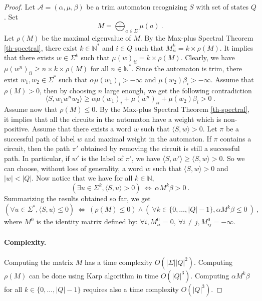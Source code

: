 \documentclass{article}
\newcommand{\N} {\ensuremath{\mathbb{N}}}
\newcommand{\1}{\mathbb{1}}
\newcommand{\0}{\mathbb{0}}
\newcommand{\coef}[2]{\langle #1, #2\rangle}
\def\ab{\Sigma}
\def\A{\mathcal{A}}
\begin{document}
\begin{proof}
Let $\A=(\alpha,\mu,\beta)$ be a trim automaton recognizing $S$ with
set of states $Q$. Set 
\[
M=\bigoplus_{a\in \ab} \mu(a)\:.
\]
Let $\rho(M)$ be the maximal eigenvalue of $M$. 
By the Max-plus Spectral Theorem \ref{th-spectral}, there exist
$k\in \N^*$ and $i\in Q$ such that $M^k_{ii}=k\times \rho(M)$. 
It implies that there exists $w\in \ab^k$ such that 
$\mu(w)_{ii}= k\times \rho(M)$. 
Clearly, we have $\mu(w^n)_{ii} \geq n\times k \times \rho(M)$ for all $n\in \N^*$. 
Since the automaton is 
trim, there exist $w_1,w_2\in \ab^*$ such that $\alpha
\mu(w_1)_i > -\infty$ and  $\mu(w_2)\beta_i > -\infty$.  
Assume that $\rho(M)>0$, then 
by choosing $n$ large enough, we get the following contradiction
\[
\coef{S}{w_1w^nw_2} \geq \alpha
\mu(w_1)_i + \mu(w^n)_{ii} + \mu(w_2)\beta_i > 0 \:.
\]
Assume now that $\rho(M)\leq 0$. By the Max-plus Spectral Theorem
\ref{th-spectral}, 
it implies that all the circuits in the automaton have a weight which
is non-positive. 
Assume that there exists a word $w$ such
that $\coef{S}{w}>0$. Let $\pi$ be a successful path of label $w$ and 
maximal weight in the automaton. If $\pi$ contains a circuit, then 
the path $\pi'$ obtained by removing the circuit is still a successful
path. In particular, if $w'$ is the label of $\pi'$,
we have $\coef{S}{w'} \geq \coef{S}{w}>0$. 
So we can choose, without loss of generality, a word $w$ such that
$\coef{S}{w}>0$ and $|w|<|Q|$. 
Now notice that we have for all $k\in \N$,
\[
\left( \exists u \in \ab^k, \coef{S}{u}>0 \right) \ \iff \ 
\alpha M^k \beta > 0 \:.
\]
Summarizing the results obtained so far, we get
\begin{equation}\label{eq-crit}
\left( \forall u \in \ab^*, \coef{S}{u} \leq 0 \right) \ \iff \ 
\left( \rho(M) \leq 0 \right) \wedge ( \ \forall k \in \{0, \dots ,
|Q|-1\}, \alpha M^k \beta \leq 0 \ )\:,
\end{equation}
where $M^0$ is the identity matrix defined by: $\forall i, M^0_{ii}=0,
\ \forall i\neq j, M^0_{ij}=-\infty$. 

\paragraph{Complexity.}
Computing the matrix $M$ has a time complexity $O(|\ab | |Q|^2)$. 
Computing $\rho(M)$ can be done using Karp algorithm \cite[Theorem
2.19]{BCOQ} in 
time $O(|Q|^3)$. Computing $\alpha M^k \beta$ for all $k\in \{0, \dots ,
|Q|-1\}$ requires also a time complexity $O(|Q|^3)$. 
\end{proof}
\end{document}
